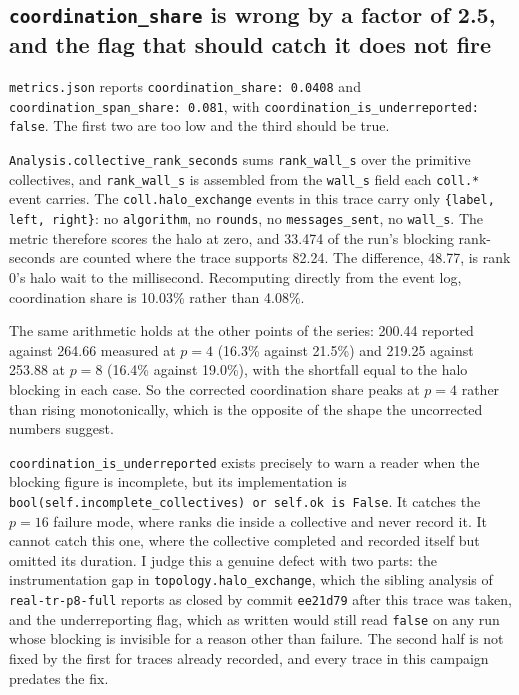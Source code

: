 \documentclass[11pt]{article}
\begin{document}
\subsection*{\texttt{coordination\_share} is wrong by a factor of 2.5, and the flag that should catch it does not fire}

\texttt{metrics.json} reports \texttt{coordination\_share: 0.0408} and
\texttt{coordination\_span\_share: 0.081}, with \texttt{coordination\_is\_underreported: false}.
The first two are too low and the third should be true.

\texttt{Analysis.collective\_rank\_seconds} sums \texttt{rank\_wall\_s} over the primitive
collectives, and \texttt{rank\_wall\_s} is assembled from the \texttt{wall\_s} field each
\texttt{coll.*} event carries. The \texttt{coll.halo\_exchange} events in this trace carry only
\texttt{\{label, left, right\}}: no \texttt{algorithm}, no \texttt{rounds}, no
\texttt{messages\_sent}, no \texttt{wall\_s}. The metric therefore scores the halo at zero, and
33.474 of the run's blocking rank-seconds are counted where the trace supports 82.24. The
difference, 48.77, is rank 0's halo wait to the millisecond. Recomputing directly from the event
log, coordination share is 10.03\% rather than 4.08\%.

The same arithmetic holds at the other points of the series: 200.44 reported against 264.66
measured at $p=4$ (16.3\% against 21.5\%) and 219.25 against 253.88 at $p=8$ (16.4\% against
19.0\%), with the shortfall equal to the halo blocking in each case. So the corrected coordination
share peaks at $p=4$ rather than rising monotonically, which is the opposite of the shape the
uncorrected numbers suggest.

\texttt{coordination\_is\_underreported} exists precisely to warn a reader when the blocking
figure is incomplete, but its implementation is \texttt{bool(self.incomplete\_collectives) or
self.ok is False}. It catches the $p=16$ failure mode, where ranks die inside a collective and
never record it. It cannot catch this one, where the collective completed and recorded itself but
omitted its duration. I judge this a genuine defect with two parts: the instrumentation gap in
\texttt{topology.halo\_exchange}, which the sibling analysis of \texttt{real-tr-p8-full} reports
as closed by commit \texttt{ee21d79} after this trace was taken, and the underreporting flag,
which as written would still read \texttt{false} on any run whose blocking is invisible for a
reason other than failure. The second half is not fixed by the first for traces already recorded,
and every trace in this campaign predates the fix.
\end{document}
